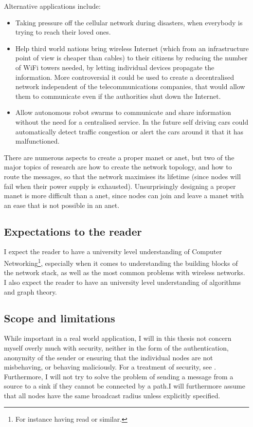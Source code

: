 Alternative applications include:
\begin{itemize}
\item Taking pressure off the cellular network during disasters, when everybody is trying to reach their loved ones.
\item Help third world nations bring wireless Internet (which from an infrastructure point of view is cheaper than cables) to their citizens by reducing the number of WiFi towers needed, by letting individual devices propagate the information. More controversial it could be used to create a decentralised network independent of the telecommunications companies, that would allow them to communicate even if the authorities shut down the Internet. 
\item Allow autonomous robot swarms to communicate and share information without the need for a centralised service. In the future self driving cars could automatically detect traffic congestion or alert the cars around it that it has malfunctioned. 
\end{itemize} 

There are numerous aspects to create a proper \ac{manet} or \ac{anet}, but two of the major topics of research are how to create the network topology, and how to route the messages, so that the network maximises its lifetime (since nodes will fail when their power supply is exhausted). Unsurprisingly designing a proper \ac{manet} is more difficult than a \ac{anet}, since nodes can join and leave a \ac{manet} with an ease that is not possible in an \ac{anet}. 

\subsection{Expectations to the reader}
I expect the reader to have a university level understanding of Computer Networking\footnote{For instance having read \cite{ComNet} or similar.}, especially when it comes to understanding the building blocks of the network stack, as well as the most common problems with wireless networks. I also expect the reader to have an university level understanding of algorithms and graph theory.

\subsection{Scope and limitations}
While important in a real world application, I will in this thesis not concern myself overly much with security, neither in the form of the authentication, anonymity of the sender or ensuring that the individual nodes are not misbehaving, or behaving maliciously. For a treatment of security, see \cite{trustedRouting}. Furthermore, I will not try to solve the problem of sending a message from a source to a sink if they cannot be connected by a path.I will furthermore assume that all nodes have the same broadcast radius unless explicitly specified.

